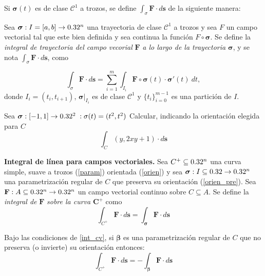 Si $\boldsymbol{\sigma}(t)$ es de clase $\mathcal{C}^1$ a trozos, se define $ \int_{\sigma}\mathbf{F}\cdot d\mathbf{s}$  de la siguiente manera:  

\begin{definition}   Sea $\boldsymbol{\sigma}:I=[a,b]\to0.32^n$ una trayectoria de clase $\mathcal{C}^1$ a trozos   y  sea $F$ un campo vectorial tal que este bien definida y sea continua   la funci\'on $F\circ\boldsymbol{\sigma}$.  Se define la \emph{integral de trayectoria del campo vecorial} $\mathbf{F}$ \emph{a lo largo de la trayectoria} $\boldsymbol{\sigma}$, y se  nota $ \int_{\sigma}\mathbf{F}\cdot d\mathbf{s}$, como
  
    \[
       \int_{\sigma}\mathbf{F}\cdot d\mathbf{s}  =\sum_{i=1}^{m}\int_{I_i}\mathbf{F} \circ\boldsymbol{\sigma}(t) \cdot \boldsymbol{\sigma}'(t) \:dt,  
    \]
    donde $ I_i= (t_i, t_{i+1})$,  $\boldsymbol{\sigma}\lvert_{I_i}$ es de clase $\mathcal{C}^1$  y  $\{t_i\}_{i=0}^{m-1}$  es una partici\'on de $I$.
\end{definition}


 \begin{tarea}Sea $\boldsymbol{\sigma}: [-1,1]\to0.32^2\;  : \sigma(t) = ( t^{2}, t^{2})$   Calcular, indicando la orientaci\'on elegida para $C$  $$ \int_{C}  (y, 2xy +1)  \cdot d\mathbf{s} $$
 \end{tarea}



\begin{definition}\label{int_cv} \textbf{Integral de l\'inea para campos vectoriales.}
  Sea $C^{+} \subseteq  0.32^n$  una curva simple,  suave a trozos  (\ref{param}) orientada (\ref{orien})  y sea $\boldsymbol{\sigma}:I\subseteq0.32\to0.32^n$ una parametrizaci\'on regular de $C$ que preserva su orientaci\'on  (\ref{orien_pre}). Sea $\mathbf{F}:A\subseteq0.32^n\to0.32^n$ un campo vectorial continuo sobre $C  \subseteq  A.$  Se define la \emph{integral de} $\mathbf{F}$ \emph{sobre la curva} $\boldsymbol{C}^{+}$ como
    \[
        \int_{C^{+}}\mathbf{F}\cdot d\mathbf{s}=\int_{\boldsymbol{\sigma}}\mathbf{F}\cdot d\mathbf{s} 
    \]
\end{definition}

\begin{obs} Bajo las condiciones de \ref{int_cv}, si $\boldsymbol{\beta}$ es una parametrizaci\'on regular de $C$ que no  preserva (o invierte) su orientaci\'on entonces: 
 \[
        \int_{C^{+}}\mathbf{F}\cdot d\mathbf{s}= - \int_{\boldsymbol{\beta}}\mathbf{F}\cdot d\mathbf{s} 
    \]
\end{obs}







